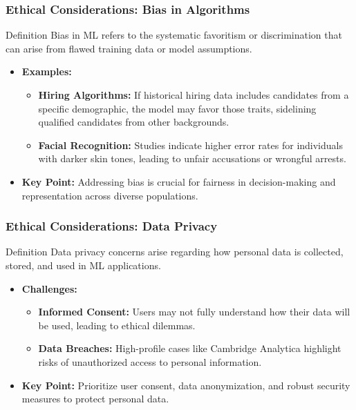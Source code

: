 \documentclass{beamer}
\begin{document}
\begin{frame}[fragile]
    \frametitle{Ethical Considerations: Bias in Algorithms}
    \begin{block}{Definition}
        Bias in ML refers to the systematic favoritism or discrimination that can arise from flawed training data or model assumptions.
    \end{block}
    
    \begin{itemize}
        \item \textbf{Examples:}
        \begin{itemize}
            \item \textbf{Hiring Algorithms:} If historical hiring data includes candidates from a specific demographic, the model may favor those traits, sidelining qualified candidates from other backgrounds.
            \item \textbf{Facial Recognition:} Studies indicate higher error rates for individuals with darker skin tones, leading to unfair accusations or wrongful arrests.
        \end{itemize}
        
        \item \textbf{Key Point:} Addressing bias is crucial for fairness in decision-making and representation across diverse populations.
    \end{itemize}
\end{frame}

\begin{frame}[fragile]
    \frametitle{Ethical Considerations: Data Privacy}
    \begin{block}{Definition}
        Data privacy concerns arise regarding how personal data is collected, stored, and used in ML applications.
    \end{block}
    
    \begin{itemize}
        \item \textbf{Challenges:}
        \begin{itemize}
            \item \textbf{Informed Consent:} Users may not fully understand how their data will be used, leading to ethical dilemmas.
            \item \textbf{Data Breaches:} High-profile cases like Cambridge Analytica highlight risks of unauthorized access to personal information.
        \end{itemize}
        
        \item \textbf{Key Point:} Prioritize user consent, data anonymization, and robust security measures to protect personal data.
    \end{itemize}
\end{frame}
\end{document}
